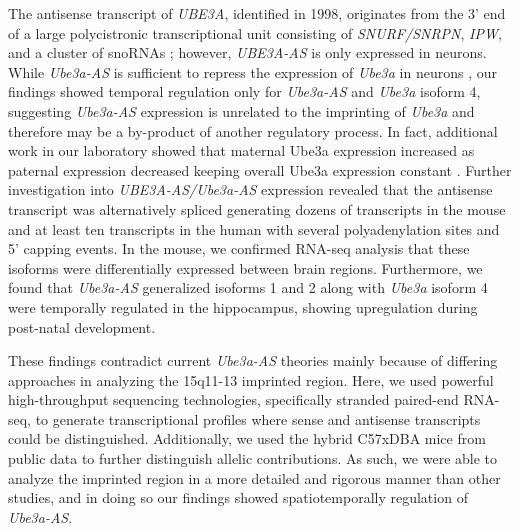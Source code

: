 The antisense transcript of \textit{UBE3A}, identified in 1998, originates from the 3' end of a large polycistronic transcriptional unit consisting of \textit{SNURF/SNRPN}, \textit{IPW}, and a cluster of snoRNAs \cite{Rougeulle1998,Landers2004,Runte2004,Runte2001}; however, \textit{UBE3A-AS} is only expressed in neurons. While \textit{Ube3a-AS} is sufficient to repress the expression of \textit{Ube3a} in neurons \cite{Meng2012,Meng2013}, our findings showed temporal regulation only for \textit{Ube3a-AS} and \textit{Ube3a} isoform 4, suggesting \textit{Ube3a-AS} expression is unrelated to the imprinting of \textit{Ube3a} and therefore may be a by-product of another regulatory process. In fact, additional work in our laboratory showed that maternal Ube3a expression increased as paternal expression decreased keeping overall Ube3a expression constant \cite{Hillman2017}. Further investigation into \textit{UBE3A-AS/Ube3a-AS} expression revealed that the antisense transcript was alternatively spliced generating dozens of transcripts in the mouse and at least ten transcripts in the human with several polyadenylation sites and 5' capping events. In the mouse, we confirmed RNA-seq analysis that these isoforms were differentially expressed between brain regions. Furthermore, we found that \textit{Ube3a-AS} generalized isoforms 1 and 2 along with \textit{Ube3a} isoform 4 were temporally regulated in the hippocampus, showing upregulation during post-natal development.

These findings contradict current \textit{Ube3a-AS} theories  mainly because of differing approaches in analyzing the 15q11-13 imprinted region. Here, we used powerful high-throughput sequencing technologies, specifically stranded paired-end RNA-seq, to generate transcriptional profiles where sense and antisense transcripts could be distinguished. Additionally, we used the hybrid C57xDBA mice from public data to further distinguish allelic contributions. As such, we were able to analyze the imprinted region in a more detailed and rigorous manner than other studies, and in doing so our findings showed spatiotemporally regulation of \textit{Ube3a-AS}.

